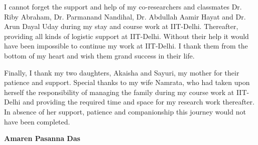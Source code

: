 I cannot forget the support and help of my co-researchers and classmates Dr. Riby Abraham, Dr. Parmanand Nandihal, Dr. Abdullah Aamir Hayat and Dr. Arun Dayal Uday during my stay and course work at IIT-Delhi. Thereafter, providing all kinds of logistic support at IIT-Delhi. Without their help it would have been impossible to continue my work at IIT-Delhi. I thank them from the bottom of my heart and wish them grand success  in their life.


Finally, I thank my two daughters, Akaisha and Sayuri, my mother for their patience  and support. Special thanks to my wife Namrata, who had taken upon herself  the responsibility of managing the family during my course work at IIT-Delhi and providing the required time and space for my research work thereafter. In absence of  her support, patience and companionship this journey would not have been completed.  



\bigskip
\bigskip
\bigskip
\bigskip

\hfill \textbf{Amaren Pasanna Das}

\restoregeometry
